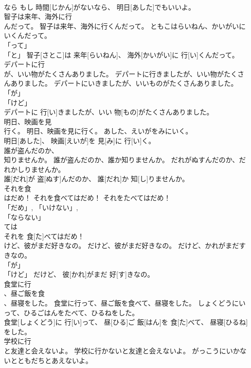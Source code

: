 \documentclass[8pt]{extreport}
\begin{document}
\begin{CJK}{UTF8}{min}
\\	なら	もし 時間[じかん]がないなら、 明日[あした]でもいいよ。		
\\	智子は来年、海外に行
\\	んだって。	智子は来年、海外に行くんだって。	ともこはらいねん、かいがいにいくんだって。	
\\	「って」 
\\	「と」	智子[さとこ]は 来年[らいねん]、 海外[かいがい]に 行[い]くんだって。		
\\	デパートに行
\\	が、いい物がたくさんありました。	デパートに行きましたが、いい物がたくさんありました。	デパートにいきましたが、いいものがたくさんありました。	
\\	「が」 
\\	「けど」
\\	デパートに 行[い]きましたが、いい 物[もの]がたくさんありました。		
\\	明日、映画を見
\\	行く。	明日、映画を見に行く。	あした、えいがをみにいく。	
\\	明日[あした]、 映画[えいが]を 見[み]に 行[い]く。		
\\	誰が盗んだのか、
\\	知りませんか。	誰が盗んだのか、誰か知りませんか。	だれがぬすんだのか、だれかしりませんか。	
\\	誰[だれ]が 盗[ぬす]んだのか、 誰[だれ]か 知[し]りませんか。		
\\	それを食
\\	はだめ！	それを食べてはだめ！	それをたべてはだめ！	
\\	「だめ」, 「いけない」, 
\\	「ならない」 
\\	ては
\\	それを 食[た]べてはだめ！		
\\	けど、彼がまだ好きなの。	だけど、彼がまだ好きなの。	だけど、かれがまだすきなの。	
\\	「が」 
\\	「けど」	だけど、 彼[かれ]がまだ 好[す]きなの。		
\\	食堂に行
\\	、昼ご飯を食
\\	、昼寝をした。	食堂に行って、昼ご飯を食べて、昼寝をした。	しょくどうにいって、ひるごはんをたべて、ひるねをした。	
\\	食堂[しょくどう]に 行[い]って、 昼[ひる]ご 飯[はん]を 食[た]べて、 昼寝[ひるね]をした。		
\\	学校に行
\\	と友達と会えないよ。	学校に行かないと友達と会えないよ。	がっこうにいかないとともだちとあえないよ。	

\end{CJK}
\end{document}
